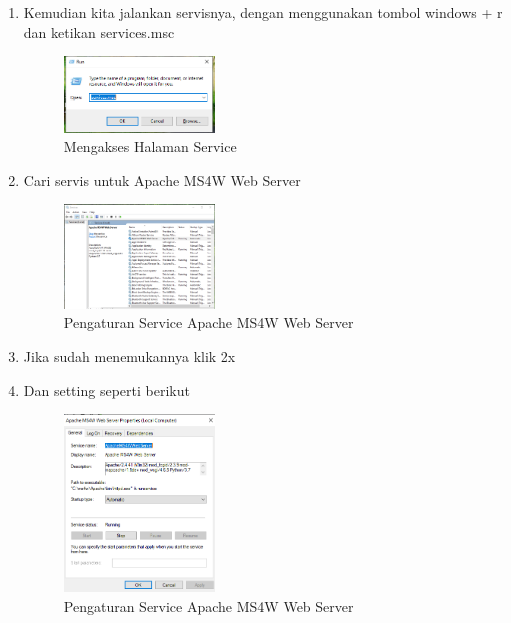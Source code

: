 \begin{enumerate}
  \item Kemudian kita jalankan servisnya, dengan menggunakan tombol windows + r dan ketikan services.msc
  \hfill\break
    \begin{figure}[H]
		\includegraphics[width=4cm]{figures/1174008/4/7.png}
		\centering
		\caption{Mengakses Halaman Service}
    \end{figure}

  \item Cari servis untuk Apache MS4W Web Server
    \begin{figure}[H]
		\includegraphics[width=4cm]{figures/1174008/4/8.png}
		\centering
		\caption{Pengaturan Service Apache MS4W Web Server}
    \end{figure}

  \item Jika sudah menemukannya klik 2x
  \item Dan setting seperti berikut
  \hfill\break
    \begin{figure}[H]
		\includegraphics[width=4cm]{figures/1174008/4/9.png}
		\centering
		\caption{Pengaturan Service Apache MS4W Web Server}
    \end{figure}

\end{enumerate}


